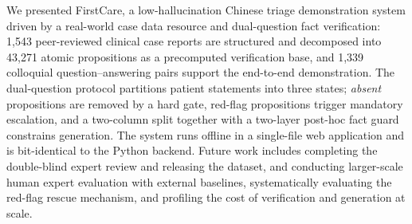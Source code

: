 We presented FirstCare, a low-hallucination Chinese triage demonstration
system driven by a real-world case data resource and dual-question fact
verification: 1{,}543 peer-reviewed clinical case reports are structured and
decomposed into 43{,}271 atomic propositions as a precomputed verification
base, and 1{,}339 colloquial question--answering pairs support the end-to-end
demonstration. The dual-question protocol partitions patient statements into
three states; \textit{absent} propositions are removed by a hard gate,
red-flag propositions trigger mandatory escalation, and a two-column split
together with a two-layer post-hoc fact guard constrains generation. The
system runs offline in a single-file web application and is bit-identical to
the Python backend. Future work includes completing the double-blind expert
review and releasing the dataset, and conducting larger-scale human expert
evaluation with external baselines, systematically evaluating the red-flag
rescue mechanism, and profiling the cost of verification and generation at
scale.

